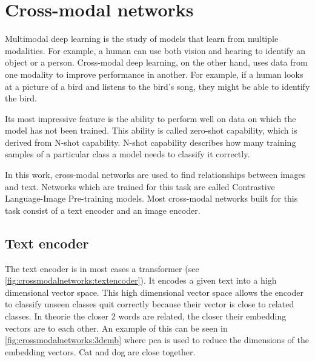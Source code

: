 %
%
%


\chapter{Cross-modal networks
    \label{chapter:crossmodalnetworks}}
    Multimodal deep learning is the study of models that learn from multiple modalities.
    For example, a human can use both vision and hearing to identify an object or a person.
    Cross-modal deep learning, on the other hand, uses data from one modality to improve performance in another.
    For example, if a human looks at a picture of a bird and listens to the bird's song, they might be able to identify the bird.
    
    Its most impressive feature is the ability to perform well on data on which the model has not been trained.
    This ability is called zero-shot capability, which is derived from N-shot capability.
    N-shot capability describes how many training samples of a particular class a model needs to classify it correctly.

    In this work, cross-modal networks are used to find relationships between images and text.
    Networks which are trained for this task are called Contrastive Language-Image Pre-training models.
    Most cross-modal networks built for this task consist of a text encoder and an image encoder.

    \section{Text encoder}
    The text encoder is in most cases a transformer (see \cref{fig:crossmodalnetworks:textencoder}).
    It encodes a given text into a high dimensional vector space.
    This high dimensional vector space allows the encoder to classify unseen classes quit correctly because their vector is close to related classes.
    In theorie the closer 2 words are related, the closer their embedding vectors are to each other.
    An example of this can be seen in \cref{fig:crossmodalnetworks:3demb} where \Acrfull{pca} is used to reduce the dimensions of the embedding vectors.
    Cat and dog are close together.

